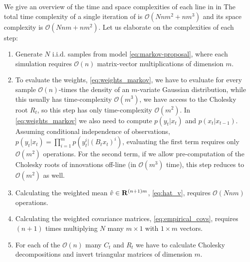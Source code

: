We give an overview of the time and space complexities of each line in  in 
The total time complexity of a single iteration of  is $\mathcal O \left( Nnm^{2} + nm^{3}\right)$ and its space complexity is $\mathcal O \left( Nnm + nm^{2}\right)$. Let us elaborate on the complexities of each step:
\begin{enumerate}
    \item[Step \ref{step:cem-simulate}] Generate $N$ i.i.d. samples from model \eqref{eq:markov-proposal}, where each simulation requires $\mathcal O(n)$ matrix-vector multiplications of dimension $m$. 
    \item[Step \ref{step:cem-weights}] To evaluate the weights, \eqref{eq:weights_markov}, we have to evaluate for every sample $\mathcal O(n)$-times the density of an $m$-variate Gaussian distribution, while this usually has time-complexity $\mathcal O(m^{3})$, we have access to the Cholesky root $R_{t}$, so this step has only time-complexity $\mathcal O(m^{2})$. In \eqref{eq:weights_markov} we also need to compute $p(y_{t}|x_{t})$ and $p(x_{t}|x_{t - 1})$. Assuming conditional independence of observations, $p(y_{t}|x_{t}) = \prod_{i = 1}^{m}p(y_{t}^i|(B_{t}x_{t})^{i})$, evaluating the first term requires only $\mathcal O(m^{2})$ operations. For the second term, if we allow pre-computation of the Cholesky roots of innovations off-line (in $\mathcal O(m^{3})$ time), this step reduces to $\mathcal O(m^{2})$ as well.  
    \item[Step \ref{step:cem-est_v}] Calculating the weighted mean $\hat v \in\mathbf R^{(n+1)m}$, \eqref{eq:hat_v}, requires $\mathcal O(Nnm)$ operations.
    \item[Step \ref{step:cem-est_cov}] Calculating the weighted covariance matrices, \eqref{eq:empirical_covs}, requires $(n+1)$ times multiplying $N$ many $m\times 1$ with $1 \times m$ vectors. 
    \item[Step \ref{step:cem-C_R}] For each of the $\mathcal O(n)$ many $C_{t}$ and $R_{t}$ we have to calculate Cholesky decompositions and invert triangular matrices of dimension $m$. 
\end{enumerate}

